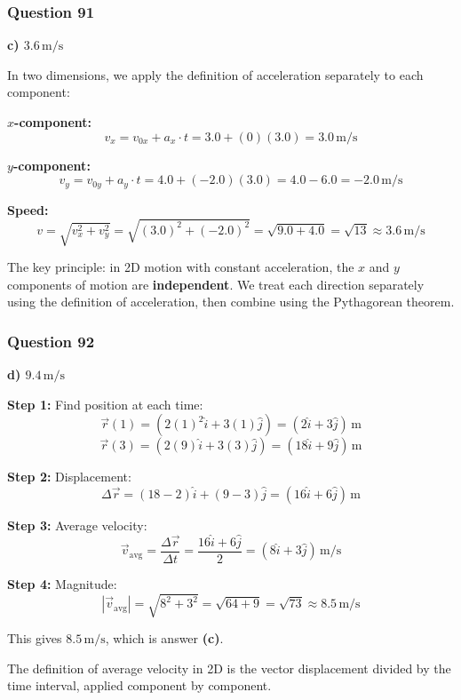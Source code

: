 \documentclass[12pt,letterpaper]{article}
\begin{document}
\subsubsection*{Question 91}

\begin{answerbox}
\textbf{c) $3.6\,\text{m/s}$}
\end{answerbox}

\begin{explanationbox}
In two dimensions, we apply the definition of acceleration separately to each component:

\textbf{$x$-component:}
\[
v_x = v_{0x} + a_x \cdot t = 3.0 + (0)(3.0) = 3.0\,\text{m/s}
\]

\textbf{$y$-component:}
\[
v_y = v_{0y} + a_y \cdot t = 4.0 + (-2.0)(3.0) = 4.0 - 6.0 = -2.0\,\text{m/s}
\]

\textbf{Speed:}
\[
v = \sqrt{v_x^2 + v_y^2} = \sqrt{(3.0)^2 + (-2.0)^2} = \sqrt{9.0 + 4.0} = \sqrt{13} \approx 3.6\,\text{m/s}
\]

The key principle: in 2D motion with constant acceleration, the $x$ and $y$ components of motion are \textbf{independent}. We treat each direction separately using the definition of acceleration, then combine using the Pythagorean theorem.
\end{explanationbox}

\subsubsection*{Question 92}

\begin{answerbox}
\textbf{d) $9.4\,\text{m/s}$}
\end{answerbox}

\begin{explanationbox}
\textbf{Step 1:} Find position at each time:
\[
\vec{r}(1) = (2(1)^2\hat{i} + 3(1)\hat{j}) = (2\hat{i} + 3\hat{j})\,\text{m}
\]
\[
\vec{r}(3) = (2(9)\hat{i} + 3(3)\hat{j}) = (18\hat{i} + 9\hat{j})\,\text{m}
\]

\textbf{Step 2:} Displacement:
\[
\Delta\vec{r} = (18 - 2)\hat{i} + (9 - 3)\hat{j} = (16\hat{i} + 6\hat{j})\,\text{m}
\]

\textbf{Step 3:} Average velocity:
\[
\vec{v}_{\text{avg}} = \frac{\Delta\vec{r}}{\Delta t} = \frac{16\hat{i} + 6\hat{j}}{2} = (8\hat{i} + 3\hat{j})\,\text{m/s}
\]

\textbf{Step 4:} Magnitude:
\[
|\vec{v}_{\text{avg}}| = \sqrt{8^2 + 3^2} = \sqrt{64 + 9} = \sqrt{73} \approx 8.5\,\text{m/s}
\]

This gives $8.5\,\text{m/s}$, which is answer \textbf{(c)}.

The definition of average velocity in 2D is the vector displacement divided by the time interval, applied component by component.
\end{explanationbox}
\end{document}
